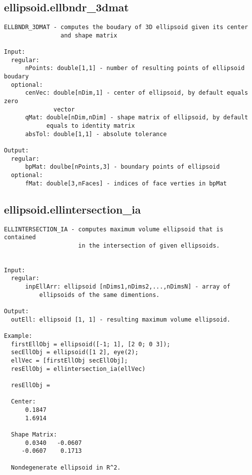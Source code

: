 \subsection{\texorpdfstring{ellipsoid.ellbndr\_3dmat}{ellbndr\_3dmat}}\label{method:ellipsoid.ellbndr3dmat}
\begin{verbatim}
ELLBNDR_3DMAT - computes the boudary of 3D ellipsoid given its center
                and shape matrix

Input:
  regular:
      nPoints: double[1,1] - number of resulting points of ellipsoid boudary
  optional:
      cenVec: double[nDim,1] - center of ellipsoid, by default equals zero
              vector
      qMat: double[nDim,nDim] - shape matrix of ellipsoid, by default
            equals to identity matrix
      absTol: double[1,1] - absolute tolerance

Output:
  regular:
      bpMat: doulbe[nPoints,3] - boundary points of ellipsoid
  optional:
      fMat: double[3,nFaces] - indices of face verties in bpMat
\end{verbatim}
\subsection{\texorpdfstring{ellipsoid.ellintersection\_ia}{ellintersection\_ia}}\label{method:ellipsoid.ellintersectionia}
\begin{verbatim}
ELLINTERSECTION_IA - computes maximum volume ellipsoid that is contained
                     in the intersection of given ellipsoids.


Input:
  regular:
      inpEllArr: ellipsoid [nDims1,nDims2,...,nDimsN] - array of
          ellipsoids of the same dimentions.

Output:
  outEll: ellipsoid [1, 1] - resulting maximum volume ellipsoid.

Example:
  firstEllObj = ellipsoid([-1; 1], [2 0; 0 3]);
  secEllObj = ellipsoid([1 2], eye(2);
  ellVec = [firstEllObj secEllObj];
  resEllObj = ellintersection_ia(ellVec)

  resEllObj =

  Center:
      0.1847
      1.6914

  Shape Matrix:
      0.0340   -0.0607
     -0.0607    0.1713

  Nondegenerate ellipsoid in R^2.
\end{verbatim}
